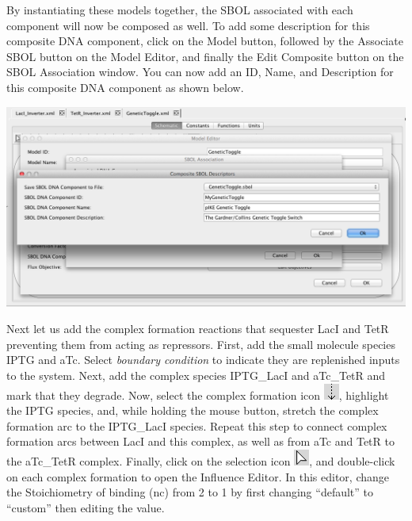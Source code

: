 \documentclass[titlepage,11pt]{article}
\begin{document}
By instantiating these models together, the SBOL associated with each component will now be composed as well.  To add some description for this composite DNA component, click on the Model button, followed by the Associate SBOL button on the Model Editor, and finally the Edit Composite button on the SBOL Association window.  You can now add an ID, Name, and Description for this composite DNA component as shown below.  

\begin{center}
\includegraphics[width=160mm]{screenshots/compSBOLDesc}
\end{center}

Next let us add the complex formation reactions that sequester LacI and TetR preventing them from acting as repressors.  First, add the small molecule species IPTG and aTc.  Select \emph{boundary condition} to indicate they are replenished inputs to the system.  Next, add the complex species IPTG\_LacI and aTc\_TetR and mark that they degrade.  Now, select the complex formation icon \includegraphics{../gui/icons/modelview/bio_activation_selected}, highlight the IPTG species, and, while holding the mouse button, stretch the complex formation arc to the IPTG\_LacI species.  Repeat this step to connect complex formation arcs between LacI and this complex, as well as from aTc and TetR to the aTc\_TetR complex.  Finally, click on the selection icon 
\includegraphics{../gui/icons/modelview/select_mode_selected}, and
double-click on each complex formation to open the Influence Editor.  In this editor, change the Stoichiometry of binding (nc) from 2 to 1 by first changing ``default'' to ``custom'' then editing the value.
\end{document}
